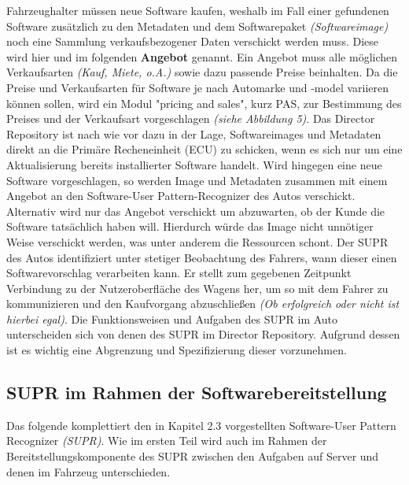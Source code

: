 Fahrzeughalter müssen neue Software kaufen, weshalb im Fall einer gefundenen Software zusätzlich zu den Metadaten und dem Softwarepaket \textit{(Softwareimage)} noch eine Sammlung verkaufsbezogener Daten verschickt werden muss. Diese wird hier und im folgenden \textbf{Angebot} genannt. Ein Angebot muss alle möglichen Verkaufsarten \textit{(Kauf, Miete, o.A.)} sowie dazu passende Preise beinhalten. Da die Preise und Verkaufsarten für Software je nach Automarke und -model variieren können sollen, wird ein Modul "pricing and sales", kurz PAS, zur Bestimmung des Preises und der Verkaufsart vorgeschlagen \textit{(siehe Abbildung 5)}. Das Director Repository ist nach wie vor dazu in der Lage, Softwareimages und Metadaten direkt an die Primäre Recheneinheit (ECU) zu schicken, wenn es sich nur um eine Aktualisierung bereits installierter Software handelt. Wird hingegen eine neue Software vorgeschlagen, so werden Image und Metadaten zusammen mit einem Angebot an den Software-User Pattern-Recognizer des Autos verschickt. Alternativ wird nur das Angebot verschickt um abzuwarten, ob der Kunde die Software tatsächlich haben will. Hierdurch würde das Image nicht unnötiger Weise verschickt werden, was unter anderem die Ressourcen schont. Der SUPR des Autos identifiziert unter stetiger Beobachtung des Fahrers, wann dieser einen Softwarevorschlag verarbeiten kann. Er stellt zum gegebenen Zeitpunkt Verbindung zu der Nutzeroberfläche des Wagens her, um so mit dem Fahrer zu kommunizieren und den Kaufvorgang abzuschließen \textit{(Ob erfolgreich oder nicht ist hierbei egal)}. Die Funktionsweisen und Aufgaben des SUPR im Auto unterscheiden sich von denen des SUPR im Director Repository. Aufgrund dessen ist es wichtig eine Abgrenzung und Spezifizierung dieser vorzunehmen.\\

\subsection{SUPR im Rahmen der Softwarebereitstellung}
Das folgende komplettiert den in Kapitel 2.3 vorgestellten Software-User Pattern Recognizer \textit{(SUPR)}. Wie im ersten Teil wird auch im Rahmen der Bereitstellungskomponente des SUPR zwischen den Aufgaben auf Server und denen im Fahrzeug unterschieden.\\

